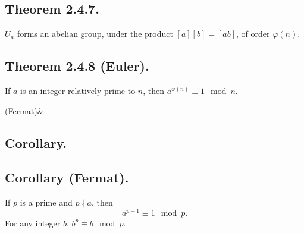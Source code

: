\documentclass{article}
\newenvironment{thm}[1]{\subsection*{Theorem #1.}}{}
\newenvironment{corollary}[1]{
    \def\temp{#1}\def\null{&}\ifx\temp\null
        \subsection*{Corollary.}
    \else
        \subsection*{Corollary #1.}
    \fi
    
}{}
\begin{document}
\begin{thm}{2.4.7}
    $U_n$ forms an abelian group, under the product $[a][b] = [ab]$, of order $\varphi(n)$.
\end{thm}

\begin{thm}{2.4.8 (Euler)}
    If $a$ is an integer relatively prime to $n$, then $a^{\varphi(n)} \equiv 1 \mod n$.
\end{thm}

\begin{corollary}{(Fermat)}
    If $p$ is a prime and $p \nmid a$, then
    \[
        a^{p-1} \equiv 1 \mod p.
    \]
    For any integer $b$, $b^p \equiv b \mod p$.
\end{corollary}
 
\end{document}
